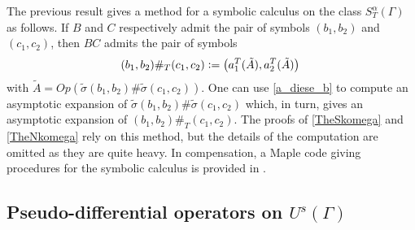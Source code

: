 \documentclass[a4paper]{article}
\begin{document}
\begin{Rem}
	\label{RemSymb}
	The previous result gives a method for a symbolic calculus on the class $S^\alpha_T(\Gamma)$ as follows. If $B$ and $C$ respectively admit the pair of symbols $(b_1,b_2)$ and $(c_1,c_2)$, then $BC$ admits the pair of symbols 
	\[(b_1,b_2) \#_T (c_1,c_2) \mathrel{\mathop:}= \left(a_1^T(\tilde{A}),a_2^T(\tilde{A})\right)\,\]
	with $\tilde{A} = \textit{Op}\left(\tilde{\sigma}(b_1,b_2) \# \tilde{\sigma}(c_1,c_2) \right)$.
	One can use \eqref{a_diese_b} to compute an asymptotic expansion of $\tilde{\sigma}(b_1,b_2) \# \tilde{\sigma}(c_1,c_2)$ which, in turn, gives an asymptotic expansion of $(b_1,b_2) \#_T (c_1,c_2)$. The proofs of \autoref{TheSkomega} and \autoref{TheNkomega} rely on this method, but the details of the computation are omitted as they are quite heavy. In compensation, a Maple code giving procedures for the symbolic calculus is provided in \cite{aversengSymbolicCalculus}.
\end{Rem}
\subsection{Pseudo-differential operators on $U^s(\Gamma)$}
\end{document}
